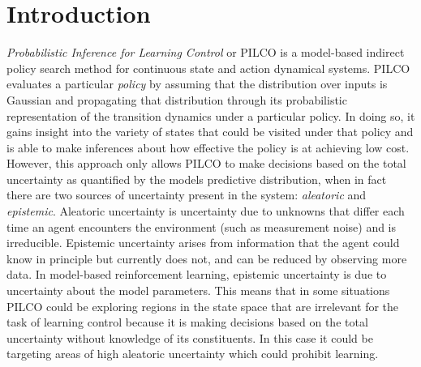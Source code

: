 
\chapter{Introduction}  %

\ifpdf
    \graphicspath{{Chapter1/Figs/Raster/}{Chapter1/Figs/PDF/}{Chapter1/Figs/}}
\else
    \graphicspath{{Chapter1/Figs/Vector/}{Chapter1/Figs/}{Chapter1/Figures/}}
\fi


\textit{Probabilistic Inference for Learning Control} or PILCO \citep{deisenroth2011pilco} is a model-based indirect policy search method for continuous state and action dynamical systems. PILCO evaluates a particular \textit{policy} by assuming that the distribution over inputs is Gaussian and propagating that distribution through its probabilistic representation of the transition dynamics under a particular policy. In doing so, it gains insight into the variety of states that could be visited under that policy and is able to make inferences about how effective the policy is at achieving low cost. However, this approach only allows PILCO to make decisions based on the total uncertainty as quantified by the models predictive distribution, when in fact there are two sources of uncertainty present in the system: \textit{aleatoric} and \textit{epistemic}. Aleatoric uncertainty is uncertainty due to unknowns that differ each time an agent encounters the environment (such as measurement noise) and is irreducible. Epistemic uncertainty arises from information that the agent could know in principle but currently does not, and can be reduced by observing more data. In model-based reinforcement learning, epistemic uncertainty is due to uncertainty about the model parameters. This means that in some situations PILCO could be exploring regions in the state space that are irrelevant for the task of learning control because it is making decisions based on the total uncertainty without knowledge of its constituents. In this case it could be targeting areas of high aleatoric uncertainty which could prohibit learning. 

